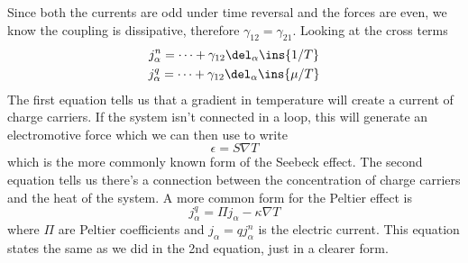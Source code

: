 Since both the currents are odd under time reversal and the forces are even, we know the coupling is dissipative, therefore \(\gamma_{12} = \gamma_{21}\). Looking at the cross terms
\begin{gather}
	j_\alpha^n = \cdots + \gamma_{12}\del_\alpha\ins{1/T} \\
	j_\alpha^q = \cdots + \gamma_{12}\del_\alpha\ins{\mu/T}
\end{gather}
The first equation tells us that a gradient in temperature will create a current of charge carriers. If the system isn't connected in a loop, this will generate an electromotive force which we can then use to write
\begin{equation}
	\epsilon = S\nabla T
\end{equation}
which is the more commonly known form of the Seebeck effect. The second equation tells us there's a connection between the concentration of charge carriers and the heat of the system. A more common form for the Peltier effect is
\begin{equation}
	j^q_\alpha = \Pi j_\alpha - \kappa\nabla T
\end{equation}
where \(\Pi\) are Peltier coefficients and \(j_\alpha=qj^n_\alpha\) is the electric current. This equation states the same as we did in the 2nd equation, just in a clearer form.
